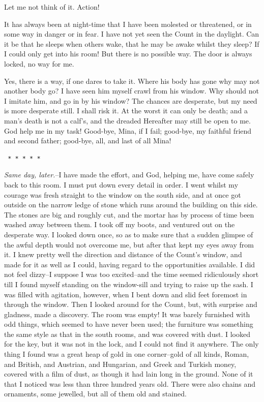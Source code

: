 \documentclass[12pt,openright]{book}
\begin{document}
Let me not think of it. Action!

It has always been at night-time that I have been molested or threatened, or in some way in danger or in fear. I have not yet seen the Count in the daylight. Can it be that he sleeps when others wake, that he may be awake whilst they sleep? If I could only get into his room! But there is no possible way. The door is always locked, no way for me.

Yes, there is a way, if one dares to take it. Where his body has gone why may not another body go? I have seen him myself crawl from his window. Why should not I imitate him, and go in by his window? The chances are desperate, but my need is more desperate still. I shall risk it. At the worst it can only be death; and a man’s death is not a calf’s, and the dreaded Hereafter may still be open to me. God help me in my task! Good-bye, Mina, if I fail; good-bye, my faithful friend and second father; good-bye, all, and last of all Mina!

\texttt{   *       *       *       *       *}

\textit{Same day, later.}–I have made the effort, and God, helping me, have come safely back to this room. I must put down every detail in order. I went whilst my courage was fresh straight to the window on the south side, and at once got outside on the narrow ledge of stone which runs around the building on this side. The stones are big and roughly cut, and the mortar has by process of time been washed away between them. I took off my boots, and ventured out on the desperate way. I looked down once, so as to make sure that a sudden glimpse of the awful depth would not overcome me, but after that kept my eyes away from it. I knew pretty well the direction and distance of the Count’s window, and made for it as well as I could, having regard to the opportunities available. I did not feel dizzy–I suppose I was too excited–and the time seemed ridiculously short till I found myself standing on the window-sill and trying to raise up the sash. I was filled with agitation, however, when I bent down and slid feet foremost in through the window. Then I looked around for the Count, but, with surprise and gladness, made a discovery. The room was empty! It was barely furnished with odd things, which seemed to have never been used; the furniture was something the same style as that in the south rooms, and was covered with dust. I looked for the key, but it was not in the lock, and I could not find it anywhere. The only thing I found was a great heap of gold in one corner–gold of all kinds, Roman, and British, and Austrian, and Hungarian, and Greek and Turkish money, covered with a film of dust, as though it had lain long in the ground. None of it that I noticed was less than three hundred years old. There were also chains and ornaments, some jewelled, but all of them old and stained.
\end{document}
